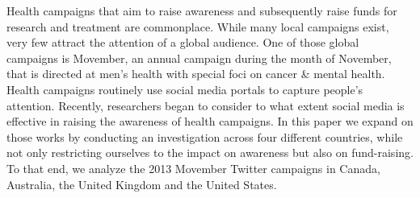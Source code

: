 Health campaigns that aim to raise awareness and subsequently raise funds for research and treatment are commonplace. While many local campaigns exist, very few attract the attention of a global audience. One of those global campaigns is Movember, an annual campaign during the month of November, that is directed at men's health with special foci on cancer \& mental health. Health campaigns routinely use social media portals to capture people's attention. Recently, researchers began to consider to what extent social media is effective in raising the awareness of health campaigns. In this paper we expand on those works by conducting an investigation across four different countries, while not only restricting ourselves to the impact on awareness but also on fund-raising. To that end, we analyze the 2013 Movember Twitter campaigns in Canada, Australia, the United Kingdom and the United States.
